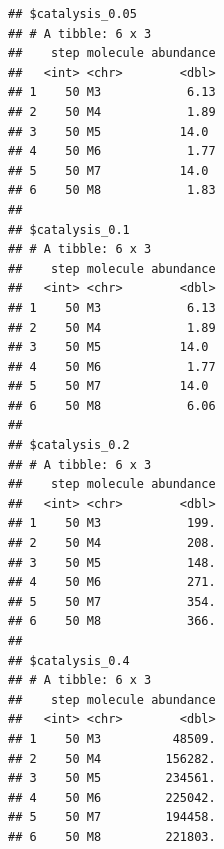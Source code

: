 \documentclass[
  oneside,
  openany]{book}
\newenvironment{Shaded}{\begin{snugshade}}{\end{snugshade}}
\newcommand{\AttributeTok}[1]{\textcolor[rgb]{0.13,0.29,0.53}{#1}}
\newcommand{\ControlFlowTok}[1]{\textcolor[rgb]{0.13,0.29,0.53}{\textbf{#1}}}
\newcommand{\DecValTok}[1]{\textcolor[rgb]{0.00,0.00,0.81}{#1}}
\newcommand{\FloatTok}[1]{\textcolor[rgb]{0.00,0.00,0.81}{#1}}
\newcommand{\FunctionTok}[1]{\textcolor[rgb]{0.13,0.29,0.53}{\textbf{#1}}}
\newcommand{\NormalTok}[1]{#1}
\newcommand{\OtherTok}[1]{\textcolor[rgb]{0.56,0.35,0.01}{#1}}
\newcommand{\SpecialCharTok}[1]{\textcolor[rgb]{0.81,0.36,0.00}{\textbf{#1}}}
\newcommand{\StringTok}[1]{\textcolor[rgb]{0.31,0.60,0.02}{#1}}
\begin{document}
\begin{Shaded}
\end{Shaded}

\begin{verbatim}
## $catalysis_0.05
## # A tibble: 6 x 3
##    step molecule abundance
##   <int> <chr>        <dbl>
## 1    50 M3            6.13
## 2    50 M4            1.89
## 3    50 M5           14.0 
## 4    50 M6            1.77
## 5    50 M7           14.0 
## 6    50 M8            1.83
## 
## $catalysis_0.1
## # A tibble: 6 x 3
##    step molecule abundance
##   <int> <chr>        <dbl>
## 1    50 M3            6.13
## 2    50 M4            1.89
## 3    50 M5           14.0 
## 4    50 M6            1.77
## 5    50 M7           14.0 
## 6    50 M8            6.06
## 
## $catalysis_0.2
## # A tibble: 6 x 3
##    step molecule abundance
##   <int> <chr>        <dbl>
## 1    50 M3            199.
## 2    50 M4            208.
## 3    50 M5            148.
## 4    50 M6            271.
## 5    50 M7            354.
## 6    50 M8            366.
## 
## $catalysis_0.4
## # A tibble: 6 x 3
##    step molecule abundance
##   <int> <chr>        <dbl>
## 1    50 M3          48509.
## 2    50 M4         156282.
## 3    50 M5         234561.
## 4    50 M6         225042.
## 5    50 M7         194458.
## 6    50 M8         221803.
\end{verbatim}
\end{document}
